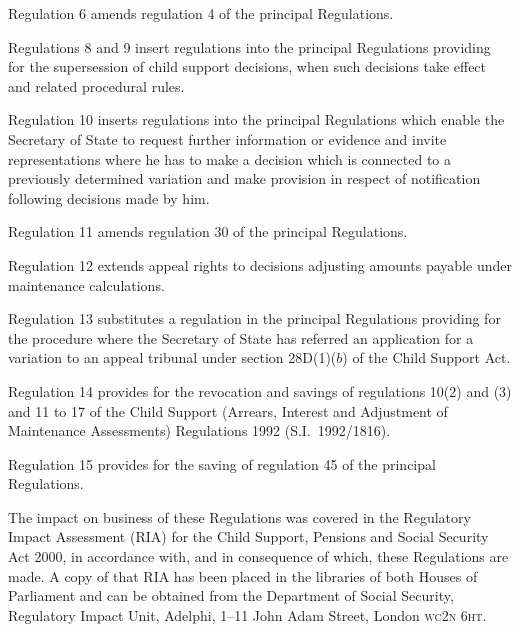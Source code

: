 \documentclass[12pt,a4paper]{article}
\begin{document}
Regulation 6 amends regulation 4 of the principal Regulations.

Regulations 8 and 9 insert regulations into the principal Regulations providing for the supersession of child support decisions, when such decisions take effect and related procedural rules.

Regulation 10 inserts regulations into the principal Regulations which enable the Secretary of State to request further information or evidence and invite representations where he has to make a decision which is connected to a previously determined variation and make provision in respect of notification following decisions made by him.

Regulation 11 amends regulation 30 of the principal Regulations.

Regulation 12 extends appeal rights to decisions adjusting amounts payable under maintenance calculations.

Regulation 13 substitutes a regulation in the principal Regulations providing for the procedure where the Secretary of State has referred an application for a variation to an appeal tribunal under section 28D(1)($b$)  of the Child Support Act.

Regulation 14 provides for the revocation and savings of regulations 10(2) and (3) and 11 to 17 of the Child Support (Arrears, Interest and Adjustment of Maintenance Assessments) Regulations 1992 (S.I.\ 1992/1816).

Regulation 15 provides for the saving of regulation 45 of the principal Regulations.

The impact on business of these Regulations was covered in the Regulatory Impact Assessment (RIA) for the Child Support, Pensions and Social Security Act 2000, in accordance with, and in consequence of which, these Regulations are made. A copy of that RIA has been placed in the libraries of both Houses of Parliament and can be obtained from the Department of Social Security, Regulatory Impact Unit, Adelphi, 1--11 John Adam Street, London \textsc{\lowercase{WC2N 6HT}}. 
\end{document}
